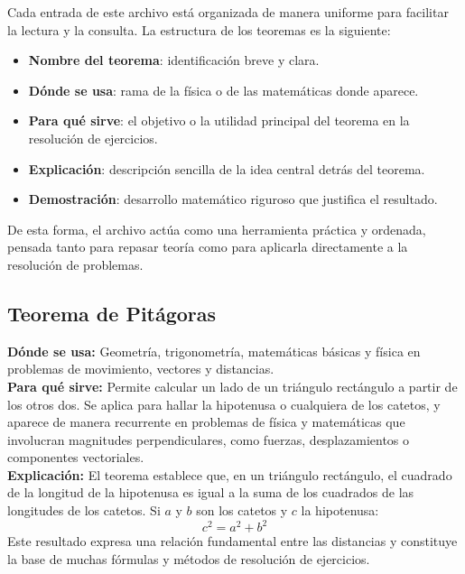 Cada entrada de este archivo está organizada de manera uniforme para 
facilitar la lectura y la consulta. La estructura de los teoremas es la siguiente:

\begin{itemize}
  \item \textbf{Nombre del teorema}: identificación breve y clara.  
  \item \textbf{Dónde se usa}: rama de la física o de las matemáticas donde aparece.  
  \item \textbf{Para qué sirve}: el objetivo o la utilidad principal del teorema 
  en la resolución de ejercicios.  
  \item \textbf{Explicación}: descripción sencilla de la idea central detrás del teorema.  
  \item \textbf{Demostración}: desarrollo matemático riguroso que justifica el resultado.  
\end{itemize}

De esta forma, el archivo actúa como una herramienta práctica y ordenada, 
pensada tanto para repasar teoría como para aplicarla directamente a la resolución 
de problemas.

\cleardoublepage
\tableofcontents

\cleardoublepage

\subsection*{Teorema de Pitágoras}

\textbf{Dónde se usa:}  
Geometría, trigonometría, matemáticas básicas y física en problemas de movimiento, vectores y distancias.\\

\textbf{Para qué sirve:}  
Permite calcular un lado de un triángulo rectángulo a partir de los otros dos. 
Se aplica para hallar la hipotenusa o cualquiera de los catetos, y aparece de manera recurrente en problemas de física y matemáticas que involucran magnitudes perpendiculares, como fuerzas, desplazamientos o componentes vectoriales.\\

\textbf{Explicación:}  
El teorema establece que, en un triángulo rectángulo, el cuadrado de la longitud de la hipotenusa es igual a la suma de los cuadrados de las longitudes de los catetos.  
Si $a$ y $b$ son los catetos y $c$ la hipotenusa:
\[
c^2 = a^2 + b^2
\]
Este resultado expresa una relación fundamental entre las distancias y constituye la base de muchas fórmulas y métodos de resolución de ejercicios.\\

